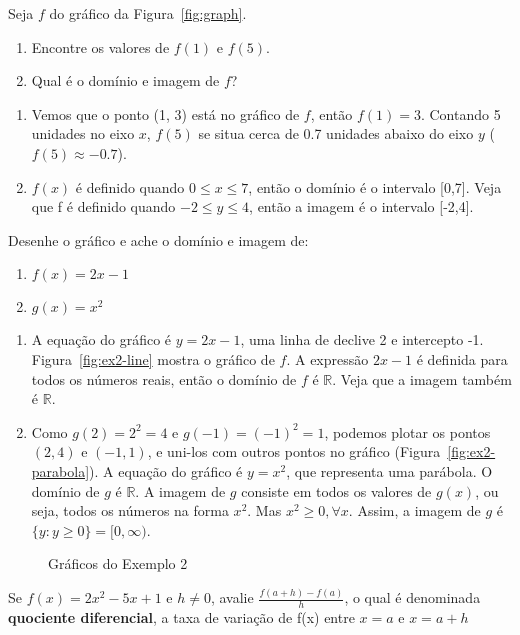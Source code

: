  Seja $f$ do gráfico da Figura~\ref{fig:graph}.
\begin{enumerate}[label=(\alph*)]
  \item Encontre os valores de $f(1)$ e $f(5)$.
  \item Qual é o domínio e imagem de $f$?
\end{enumerate}
\solution
\begin{enumerate}[label=(\alph*)]
  \item Vemos que o ponto (1, 3) está no gráfico de $f$, então $f(1) = 3$. Contando 5 unidades no eixo $x$, $f(5)$ se situa cerca de 0.7 unidades abaixo do eixo $y$ ($f(5)\approx-0.7$).
  \item $f(x)$ é definido quando $0\leq x \leq 7$, então o domínio é o intervalo [0,7]. Veja que f é definido quando $-2\leq y \leq 4$, então a imagem é o intervalo [-2,4].
\end{enumerate}
\vspace{-0.2cm}
\exampleEnd
{} Desenhe o gráfico e ache o domínio e imagem de:
\vspace{-0.4cm}\begin{multicols}{2}
  \begin{enumerate}[label=(\alph*)]
    \item $f(x)=2x-1$
    \item $g(x)=x^2$
  \end{enumerate}
\end{multicols}\vspace{-0.3cm}
\solution
\begin{enumerate}[label=(\alph*)]
  \item A equação do gráfico é $y=2x-1$, uma linha de declive 2 e intercepto -1. Figura~\ref{fig:ex2-line} mostra o gráfico de $f$. A expressão $2x-1$ é definida para todos os números reais, então o domínio de $f$ é $\mathds{R}$. Veja que a imagem também é $\mathds{R}$.
  \item Como $g(2)= 2^2 = 4$ e $g(-1) = (-1)^2 = 1$, podemos plotar os pontos $(2,4)$ e $(-1,1)$, e uni-los com outros pontos no gráfico (Figura~\ref{fig:ex2-parabola}). A equação do gráfico é $y=x^2$, que representa uma parábola. O domínio de $g$ é $\mathds{R}$. A imagem de $g$ consiste em todos os valores de $g(x)$, ou seja, todos os números na forma $x^2$. Mas $x^2\geq 0, \forall x$. Assim, a imagem de $g$ é $\{y:y\geq 0\} = [0,\infty)$.\vspace{-0.3cm}
\end{enumerate}
\begin{figure}[!ht]
  \centering
  \caption{Gráficos do Exemplo 2}
\end{figure}
\vspace{-0.6cm}
\exampleEnd
{} Se $f(x)=2x^2-5x+1$ e $h\neq 0$, avalie $\displaystyle\frac{f(a+h)-f(a)}{h}$, o qual é denominada \textbf{quociente diferencial}, a taxa de variação de f(x) entre $x=a$ e $x=a+h$

